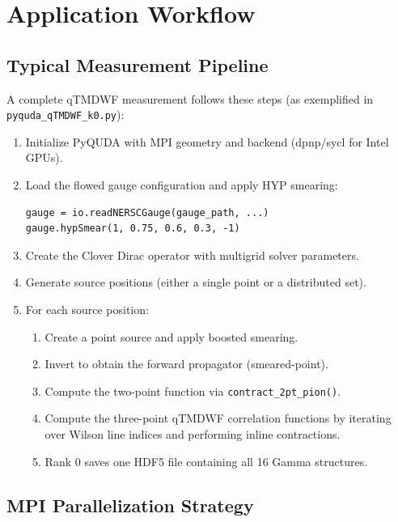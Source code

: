 \documentclass[11pt]{article}
\begin{document}
\section{Application Workflow}
\label{sec:workflow}

\subsection{Typical Measurement Pipeline}

A complete qTMDWF measurement follows these steps (as exemplified in \texttt{pyquda\_qTMDWF\_k0.py}):

\begin{enumerate}
    \item Initialize PyQUDA with MPI geometry and backend (dpnp/sycl for Intel GPUs).
    \item Load the flowed gauge configuration and apply HYP smearing:
    \begin{lstlisting}
gauge = io.readNERSCGauge(gauge_path, ...)
gauge.hypSmear(1, 0.75, 0.6, 0.3, -1)
    \end{lstlisting}
    \item Create the Clover Dirac operator with multigrid solver parameters.
    \item Generate source positions (either a single point or a distributed set).
    \item For each source position:
    \begin{enumerate}
        \item Create a point source and apply boosted smearing.
        \item Invert to obtain the forward propagator (smeared-point).
        \item Compute the two-point function via \texttt{contract\_2pt\_pion()}.
        \item Compute the three-point qTMDWF correlation functions by iterating over Wilson line indices and performing inline contractions.
        \item Rank 0 saves one HDF5 file containing all 16 Gamma structures.
    \end{enumerate}
\end{enumerate}

\subsection{MPI Parallelization Strategy}
\end{document}
